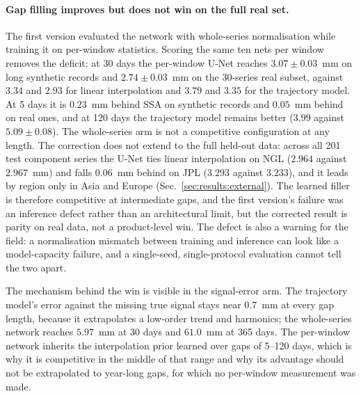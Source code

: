 \paragraph{Gap filling improves but does not win on the full real set.}
The first version evaluated the network with whole-series normalisation while
training it on per-window statistics. Scoring the same ten nets per window
removes the deficit: at 30 days the per-window U-Net reaches $3.07 \pm 0.03$~mm
on long synthetic records and $2.74 \pm 0.03$~mm on the 30-series real subset,
against $3.34$ and $2.93$ for linear interpolation and $3.79$ and $3.35$ for the
trajectory model. At 5 days it is $0.23$~mm behind SSA on synthetic records and
$0.05$~mm behind on real ones, and at 120 days the trajectory model remains
better ($3.99$ against $5.09 \pm 0.08$). The whole-series arm is not a
competitive configuration at any length. The correction does not extend to the
full held-out data: across all 201 test component series the U-Net ties linear
interpolation on NGL ($2.964$ against $2.967$~mm) and falls $0.06$~mm behind on
JPL ($3.293$ against $3.233$), and it leads by region only in Asia and Europe
(Sec.~\ref{sec:results:external}). The learned filler is therefore competitive
at intermediate gaps, and the first version's failure was an inference defect
rather than an architectural limit, but the corrected result is parity on real
data, not a product-level win. The defect is also a warning for the field: a
normalisation mismatch between training and inference can look like a
model-capacity failure, and a single-seed, single-protocol evaluation cannot
tell the two apart.

The mechanism behind the win is visible in the signal-error arm. The trajectory
model's error against the missing true signal stays near $0.7$~mm at every gap
length, because it extrapolates a low-order trend and harmonics; the
whole-series network reaches $5.97$~mm at 30 days and $61.0$~mm at 365 days.
The per-window network inherits the interpolation prior learned over gaps of
5--120 days, which is why it is competitive in the middle of that range and why
its advantage should not be extrapolated to year-long gaps, for which no
per-window measurement was made.

